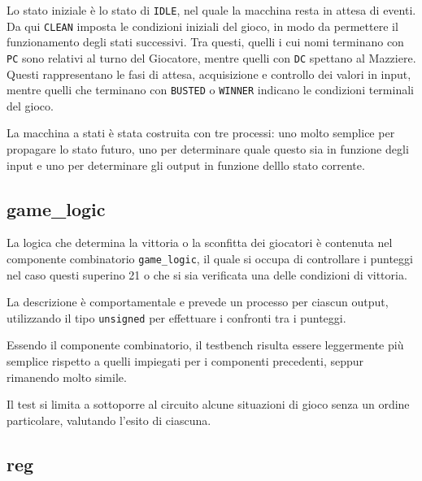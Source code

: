 \documentclass [11pt,a4paper,oneside]{article}
\newcommand{\component}[1]{\texttt{#1}}
\newcommand{\identifier}[1]{\texttt{#1}}
\begin{document}
Lo stato iniziale è lo stato di \identifier{IDLE}, nel quale la macchina resta
in attesa di eventi. Da qui \identifier{CLEAN} imposta le condizioni iniziali
del gioco, in modo da permettere il funzionamento degli stati successivi.
Tra questi, quelli i cui nomi
terminano con \identifier{PC} sono relativi al turno del Giocatore, mentre 
quelli con \identifier{DC} spettano al Mazziere. Questi rappresentano le fasi
di attesa, acquisizione e controllo dei valori in input, mentre quelli
che terminano con \identifier{BUSTED} o \identifier{WINNER} indicano le condizioni 
terminali del gioco.



La macchina a stati è stata costruita con tre processi: uno molto 
semplice per propagare lo stato futuro, uno per determinare quale
questo sia in funzione degli input e uno per determinare gli output
in funzione delllo stato corrente.



\subsection{game\_logic}

La logica che determina la vittoria o la sconfitta dei giocatori è
contenuta nel componente combinatorio \component{game\_logic}, il quale
si occupa di controllare i punteggi nel caso questi superino 21 o
che si sia verificata una delle condizioni di vittoria.



La descrizione è comportamentale e prevede un processo per ciascun
output, utilizzando il tipo \identifier{unsigned} per effettuare i confronti
tra i punteggi.



Essendo il componente combinatorio, il testbench risulta essere
leggermente più semplice rispetto a quelli impiegati per i componenti
precedenti, seppur rimanendo molto simile.



Il test si limita a sottoporre al circuito alcune situazioni di 
gioco senza un ordine particolare, valutando l'esito di ciascuna.

\subsection{reg}
\end{document}
